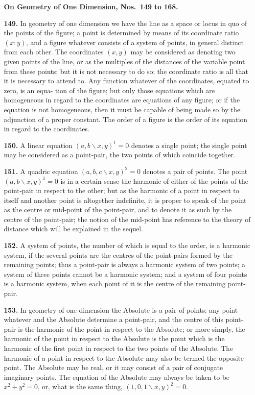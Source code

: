 \documentclass[11pt,a4paper]{article}
\begin{document}
\medskip
\textbf{On Geometry of One Dimension, Nos.~149 to 168.}

\textbf{149.} In geometry of one dimension we have the line as a space or locus in
quo of the points of the figure; a point is determined by means of its coordinate
ratio $(x:y)$, and a figure whatever consists of a system of points, in general distinct
from each other. The coordinates $(x,y)$ may be considered as denoting two given
points of the line, or as the multiples of the distances of the variable point from these
points; but it is not necessary to do so; the coordinate ratio is all that it is necessary
to attend to. Any function whatever of the coordinates, equated to zero, is an equa-
tion of the figure; but only those equations which are homogeneous in regard to the
coordinates are equations of any figure; or if the equation is not homogeneous, then it
must be capable of being made so by the adjunction of a proper constant. The order
of a figure is the order of its equation in regard to the coordinates.

\textbf{150.} A linear equation $(a,b\!\backslash x,y)^1=0$ denotes a single point; the single point
may be considered as a point-pair, the two points of which coincide together.

\textbf{151.} A quadric equation $(a,b,c\!\backslash x,y)^2=0$ denotes a pair of points. The point
$(a,b\!\backslash x,y)^1=0$ is in a certain sense the harmonic of either of the points of the point-pair
in respect to the other; but as the harmonic of a point in respect to itself and another
point is altogether indefinite, it is proper to speak of the point as the centre or mid-point
of the point-pair, and to denote it as such by the centre of the point-pair; the notion
of the mid-point has reference to the theory of distance which will be explained in the
sequel.

\textbf{152.} A system of points, the number of which is equal to the order, is a harmonic
system, if the several points are the centres of the point-pairs formed by the remaining
points; thus a point-pair is always a harmonic system of two points; a system of
three points cannot be a harmonic system; and a system of four points is a harmonic
system, when each point of it is the centre of the remaining point-pair.

\textbf{153.} In geometry of one dimension the Absolute is a pair of points; any point
whatever and the Absolute determine a point-pair, and the centre of this point-pair is
the harmonic of the point in respect to the Absolute; or more simply, the harmonic of
the point in respect to the Absolute is the point which is the harmonic of the first point
in respect to the two points of the Absolute. The harmonic of a point in respect to the
Absolute may also be termed the opposite point. The Absolute may be real, or it may
consist of a pair of conjugate imaginary points. The equation of the Absolute may
always be taken to be $x^2+y^2=0$, or, what is the same thing, $(1,0,1\!\backslash x,y)^2=0$.
\end{document}
